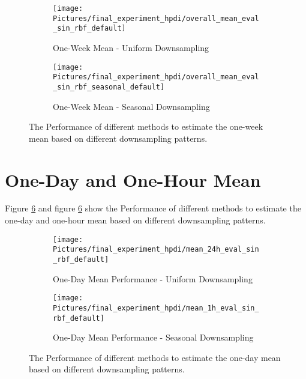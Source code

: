 \begin{figure}[!ht]
\centering
\begin{subfigure}{\textwidth}
    \centering
    \texttt{[image: Pictures/final\_experiment\_hpdi/overall\_mean\_eval\_sin\_rbf\_default]}
    \caption{One-Week Mean - Uniform Downsampling}
    \label{fig:weekly-mean-uniform-sampling-performance}
\end{subfigure}

\bigskip

\begin{subfigure}{\textwidth}
    \centering
    \texttt{[image: Pictures/final\_experiment\_hpdi/overall\_mean\_eval\_sin\_rbf\_seasonal\_default]}
    \caption{One-Week Mean - Seasonal Downsampling}
    \label{fig:weekly-mean-seasonal-sampling-performance}
\end{subfigure}
\caption[One-Week Mean Performance]{The Performance of different methods to
estimate the one-week mean based on different downsampling patterns.
}
\label{fig:weekly-mean-performance}
\end{figure}



\section{One-Day and One-Hour Mean}

Figure \ref{fig:daily-mean-performance} and figure \ref{fig:daily-mean-performance}
show the Performance of different methods to
estimate the one-day and one-hour mean based on different downsampling patterns.



\begin{figure}[!ht]
\centering
\begin{subfigure}{\textwidth}
    \centering
    \texttt{[image: Pictures/final\_experiment\_hpdi/mean\_24h\_eval\_sin\_rbf\_default]}
    \caption{One-Day Mean Performance - Uniform Downsampling}
    \label{fig:daily-mean-uniform-sampling-performance}
\end{subfigure}

\bigskip

\begin{subfigure}{\textwidth}
    \centering
    \texttt{[image: Pictures/final\_experiment\_hpdi/mean\_1h\_eval\_sin\_rbf\_default]}
    \caption{One-Day Mean Performance - Seasonal Downsampling}
    \label{fig:daily-mean-seasonal-sampling-performance}
\end{subfigure}
\caption[One-Day Mean Performance]{The Performance of different methods to
estimate the one-day mean based on different downsampling patterns.
}
\label{fig:daily-mean-performance}
\end{figure}




